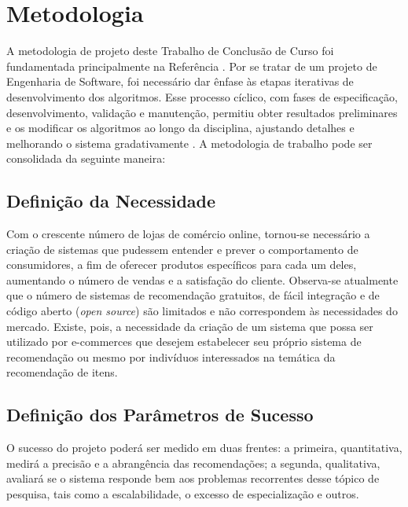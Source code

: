 \chapter[Metodologia]{Metodologia}
\label{chap:metodologia}

A metodologia de projeto deste Trabalho de Conclusão de Curso foi fundamentada principalmente na Referência \cite{pmbok}. Por se tratar de um projeto de Engenharia de Software, foi necessário dar ênfase às etapas iterativas de desenvolvimento dos algoritmos. Esse processo cíclico, com fases de especificação, desenvolvimento, validação e manutenção, permitiu obter resultados preliminares e os modificar os algoritmos ao longo da disciplina, ajustando detalhes e melhorando o sistema gradativamente \cite{iterative-development}. A metodologia de trabalho pode ser consolidada da seguinte maneira: 

\section{Definição da Necessidade} %
\label{sec:defini_o_da_necessidade}


Com o crescente número de lojas de comércio online, tornou-se necessário a criação de sistemas que pudessem entender e prever o comportamento de consumidores, a fim de oferecer produtos específicos para cada um deles, aumentando o número de vendas e a satisfação do cliente. Observa-se atualmente que o número de sistemas de recomendação gratuitos, de fácil integração e de código aberto (\textit{open source}) são limitados e não correspondem às necessidades do mercado. Existe, pois, a necessidade da criação de um sistema que possa ser utilizado por e-commerces que desejem estabelecer seu próprio sistema de recomendação ou mesmo por indivíduos interessados na temática da recomendação de itens.

\section{Definição dos Parâmetros de Sucesso} %
\label{sec:defini_o_dos_par_metros_de_sucesso}


O sucesso do projeto poderá ser medido em duas frentes: a primeira, quantitativa, medirá a precisão e a abrangência das recomendações; a segunda, qualitativa, avaliará se o sistema responde bem aos problemas recorrentes desse tópico de pesquisa, tais como a escalabilidade, o excesso de especialização e outros. 

